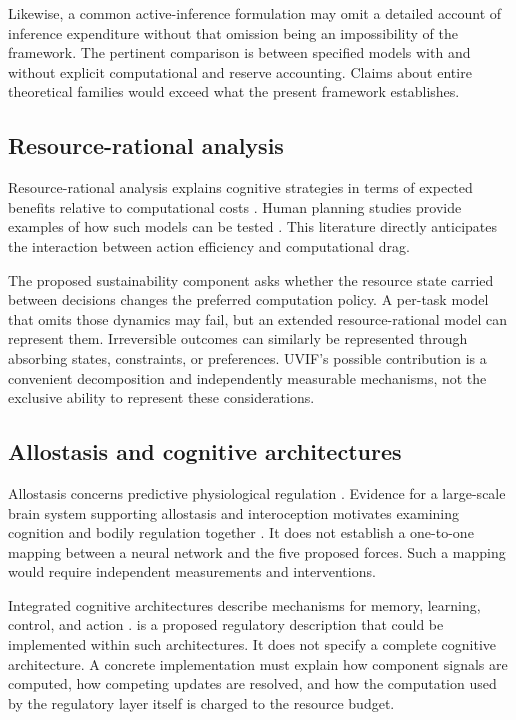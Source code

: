 Likewise, a common active-inference formulation may omit a detailed account of inference expenditure without that omission being an impossibility of the framework. The pertinent comparison is between specified models with and without explicit computational and reserve accounting. Claims about entire theoretical families would exceed what the present framework establishes.

\subsection{Resource-rational analysis}
\label{subsec:resource_rational}
Resource-rational analysis explains cognitive strategies in terms of expected benefits relative to computational costs \citep{lieder2019resourcerational,griffiths2015rational}. Human planning studies provide examples of how such models can be tested \citep{callaway2022rational}. This literature directly anticipates the interaction between action efficiency and computational drag.

The proposed sustainability component asks whether the resource state carried between decisions changes the preferred computation policy. A per-task model that omits those dynamics may fail, but an extended resource-rational model can represent them. Irreversible outcomes can similarly be represented through absorbing states, constraints, or preferences. UVIF's possible contribution is a convenient decomposition and independently measurable mechanisms, not the exclusive ability to represent these considerations.

\subsection{Allostasis and cognitive architectures}
\label{subsec:allostasis}
Allostasis concerns predictive physiological regulation \citep{schulkin2019allostasis}. Evidence for a large-scale brain system supporting allostasis and interoception motivates examining cognition and bodily regulation together \citep{kleckner2017evidence}. It does not establish a one-to-one mapping between a neural network and the five proposed forces. Such a mapping would require independent measurements and interventions.

\label{subsec:architectures}
Integrated cognitive architectures describe mechanisms for memory, learning, control, and action \citep{laird2017standard,kotseruba201840}. \uvif{} is a proposed regulatory description that could be implemented within such architectures. It does not specify a complete cognitive architecture. A concrete implementation must explain how component signals are computed, how competing updates are resolved, and how the computation used by the regulatory layer itself is charged to the resource budget.

